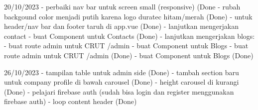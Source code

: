 20/10/2023
    - perbaiki nav bar untuk screen small (responsive) (Done
    - rubah backgound color menjadi putih karena logo duratec hitam/merah (Done)
    - untuk header/nav bar dan footer taruh di app.vue (Done)
    - lanjutkan mengerjakan contact
         - buat Component untuk Contacts (Done)
    - lanjutkan mengerjakan blogs:
        - buat route admin untuk CRUT   /admin
        - buat Component untuk Blogs
        - buat route admin untuk CRUT   /admin (Done)
        - buat Component untuk Blogs (Done)
    
26/10/2023
   - tampilan table untuk admin side (Done)
   - tambah section baru untuk company profile di bawah carousel (Done)
   - height carousel di kurangi (Done)
   - pelajari firebase auth (sudah bisa login dan register menggunakan firebase auth)
   - loop content header (Done)
